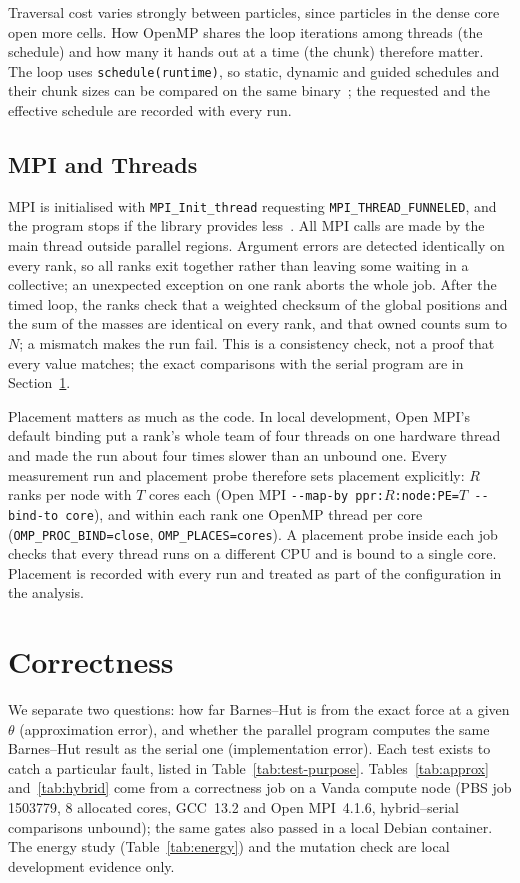\documentclass[10pt,a4paper,twocolumn,twoside]{rho-class/rho}
\begin{document}
Traversal cost varies strongly between particles, since particles in the dense core open more cells. How OpenMP shares the loop iterations among threads (the schedule) and how many it hands out at a time (the chunk) therefore matter. The loop uses \texttt{schedule(runtime)}, so static, dynamic and guided schedules and their chunk sizes can be compared on the same binary~\cite{OpenMP51,Lecture9}; the requested and the effective schedule are recorded with every run.

\subsection{MPI and Threads}
MPI is initialised with \texttt{MPI\_Init\_thread} requesting \texttt{MPI\_THREAD\_FUNNELED}, and the program stops if the library provides less~\cite{MPI40}. All MPI calls are made by the main thread outside parallel regions. Argument errors are detected identically on every rank, so all ranks exit together rather than leaving some waiting in a collective; an unexpected exception on one rank aborts the whole job. After the timed loop, the ranks check that a weighted checksum of the global positions and the sum of the masses are identical on every rank, and that owned counts sum to $N$; a mismatch makes the run fail. This is a consistency check, not a proof that every value matches; the exact comparisons with the serial program are in Section~\ref{sec:correctness}.

Placement matters as much as the code. In local development, Open MPI's default binding put a rank's whole team of four threads on one hardware thread and made the run about four times slower than an unbound one. Every measurement run and placement probe therefore sets placement explicitly: $R$ ranks per node with $T$ cores each (Open MPI \texttt{-{}-map-by ppr:$R$:node:PE=$T$ -{}-bind-to core}), and within each rank one OpenMP thread per core (\texttt{OMP\_PROC\_BIND=close}, \texttt{OMP\_PLACES=cores}). A placement probe inside each job checks that every thread runs on a different CPU and is bound to a single core. Placement is recorded with every run and treated as part of the configuration in the analysis.

\section{Correctness}
\label{sec:correctness}
We separate two questions: how far Barnes--Hut is from the exact force at a given $\theta$ (approximation error), and whether the parallel program computes the same Barnes--Hut result as the serial one (implementation error). Each test exists to catch a particular fault, listed in Table~\ref{tab:test-purpose}. Tables~\ref{tab:approx} and~\ref{tab:hybrid} come from a correctness job on a Vanda compute node (PBS job 1503779, 8 allocated cores, GCC~13.2 and Open MPI~4.1.6, hybrid--serial comparisons unbound); the same gates also passed in a local Debian container. The energy study (Table~\ref{tab:energy}) and the mutation check are local development evidence only.
\end{document}
